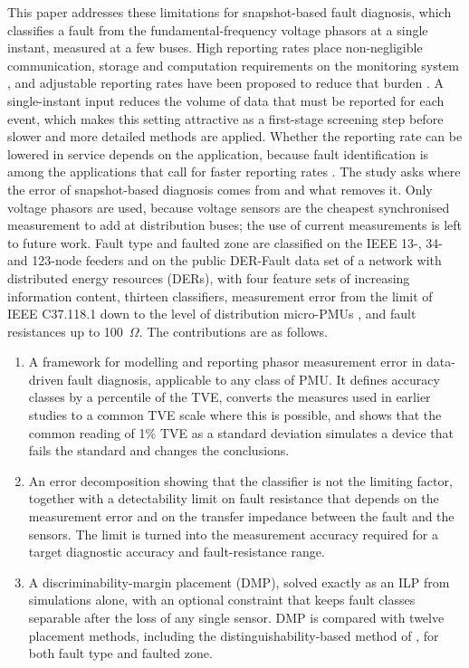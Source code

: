 \documentclass[11pt]{article}
\newenvironment{nw}{}{}
\begin{document}
\begin{nw}
This paper addresses these limitations for snapshot-based fault diagnosis, which classifies a fault from the fundamental-frequency voltage phasors at a single instant, measured at a few buses. High reporting rates place non-negligible communication, storage and computation requirements on the monitoring system \cite{shen2026dual}, and adjustable reporting rates have been proposed to reduce that burden \cite{pandey2025novel}. A single-instant input reduces the volume of data that must be reported for each event, which makes this setting attractive as a first-stage screening step before slower and more detailed methods are applied. Whether the reporting rate can be lowered in service depends on the application, because fault identification is among the applications that call for faster reporting rates \cite{pandey2025novel}. The study asks where the error of snapshot-based diagnosis comes from and what removes it. Only voltage phasors are used, because voltage sensors are the cheapest synchronised measurement to add at distribution buses; the use of current measurements is left to future work. Fault type and faulted zone are classified on the IEEE 13-, 34- and 123-node feeders and on the public DER-Fault data set \cite{derfault} of a network with distributed energy resources (DERs), with four feature sets of increasing information content, thirteen classifiers, measurement error from the limit of IEEE C37.118.1 down to the level of distribution micro-PMUs \cite{upmu}, and fault resistances up to 100~$\Omega$. The contributions are as follows.
\begin{enumerate}
\item A framework for modelling and reporting phasor measurement error in data-driven fault diagnosis, applicable to any class of PMU. It defines accuracy classes by a percentile of the TVE, converts the measures used in earlier studies to a common TVE scale where this is possible, and shows that the common reading of 1\% TVE as a standard deviation simulates a device that fails the standard and changes the conclusions. 
\item An error decomposition showing that the classifier is not the limiting factor, together with a detectability limit on fault resistance that depends on the measurement error and on the transfer impedance between the fault and the sensors. The limit is turned into the measurement accuracy required for a target diagnostic accuracy and fault-resistance range. 
\item A discriminability-margin placement (DMP), solved exactly as an ILP from simulations alone, with an optional constraint that keeps fault classes separable after the loss of any single sensor. DMP is compared with twelve placement methods, including the distinguishability-based method of \cite{kaliuzhnyi2027statistical}, for both fault type and faulted zone. 

\end{enumerate}
\end{nw}
\end{document}
